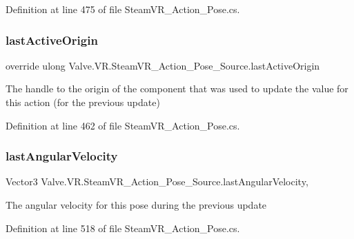 Definition at line 475 of file Steam\+V\+R\+\_\+\+Action\+\_\+\+Pose.\+cs.

\mbox{\label{class_valve_1_1_v_r_1_1_steam_v_r___action___pose___source_a0e28c7700a0694b08cf85a4e68ed41e4}} 
\subsubsection{\texorpdfstring{lastActiveOrigin}{lastActiveOrigin}}
{\footnotesize\ttfamily override ulong Valve.\+V\+R.\+Steam\+V\+R\+\_\+\+Action\+\_\+\+Pose\+\_\+\+Source.\+last\+Active\+Origin\hspace{0.3cm}{\ttfamily [get]}}



The handle to the origin of the component that was used to update the value for this action (for the previous update) 



Definition at line 462 of file Steam\+V\+R\+\_\+\+Action\+\_\+\+Pose.\+cs.

\mbox{\label{class_valve_1_1_v_r_1_1_steam_v_r___action___pose___source_aad9297276978e92547f6631931ffaa54}} 
\subsubsection{\texorpdfstring{lastAngularVelocity}{lastAngularVelocity}}
{\footnotesize\ttfamily Vector3 Valve.\+V\+R.\+Steam\+V\+R\+\_\+\+Action\+\_\+\+Pose\+\_\+\+Source.\+last\+Angular\+Velocity\hspace{0.3cm}{\ttfamily [get]}, {}}



The angular velocity for this pose during the previous update 



Definition at line 518 of file Steam\+V\+R\+\_\+\+Action\+\_\+\+Pose.\+cs.

